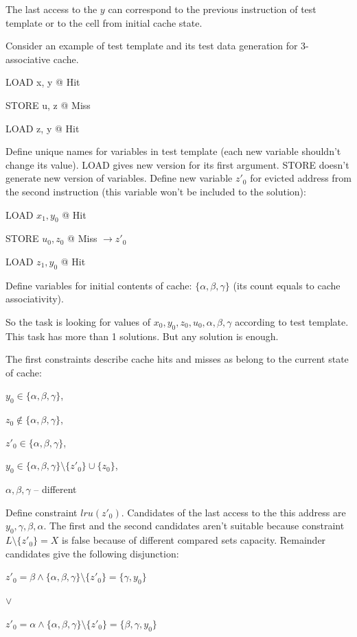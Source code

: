 The last access to the $y$ can correspond to the previous
instruction of test template or to the cell from initial cache
state.

Consider an example of test template and its test data generation
for 3-associative cache.

LOAD x, y @ Hit

STORE u, z @ Miss

LOAD z, y @ Hit

Define unique names for variables in test template (each new
variable shouldn't change its value). LOAD gives new version for its
first argument. STORE doesn't generate new version of variables.
Define new variable $z'_0$ for evicted address from the second
instruction (this variable won't be included to the solution):

LOAD $x_1, y_0$ @ Hit

STORE $u_0, z_0$ @ Miss $\rightarrow z'_0$

LOAD $z_1, y_0$ @ Hit

Define variables for initial contents of cache: $\{ \alpha, \beta,
\gamma \}$ (its count equals to cache associativity).

So the task is looking for values of $x_0, y_0, z_0, u_0, \alpha,
\beta, \gamma$ according to test template. This task has more than 1
solutions. But any solution is enough.

The first constraints describe cache hits and misses as belong to
the current state of cache:

$y_0 \in \{ \alpha, \beta, \gamma \}$,

$z_0 \notin \{ \alpha, \beta, \gamma \}$,

$z'_0 \in \{ \alpha, \beta, \gamma \}$,

$y_0 \in \{ \alpha, \beta, \gamma \} \setminus \{z'_0 \} \cup \{ z_0
\}$,

$\alpha, \beta, \gamma$ -- different

Define constraint $lru(z'_0)$. Candidates of the last access to the
this address are $y_0, \gamma, \beta, \alpha$. The first and the
second candidates aren't suitable because constraint $L\setminus \{
z'_0\} = X$ is false because of different compared sets capacity.
Remainder candidates give the following disjunction:

$z'_0 = \beta \wedge \{ \alpha, \beta, \gamma \} \setminus \{z'_0 \}
= \{ \gamma, y_0 \}$

$\vee$

$z'_0 = \alpha \wedge \{ \alpha, \beta, \gamma \} \setminus \{z'_0
\} = \{ \beta, \gamma, y_0 \}$

